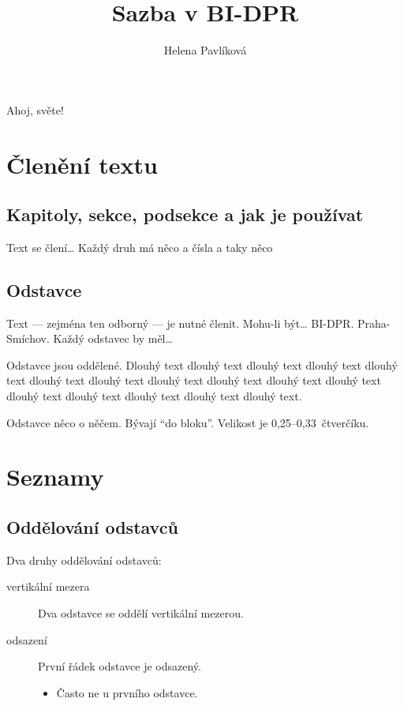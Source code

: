 \documentclass[a4paper]{article}
\title{Sazba v BI-DPR}
\author{Helena Pavlíková}
\begin{document}
    \maketitle
    
	Ahoj, světe!
	
	\tableofcontents
	
	\section{Členění textu}
	
	\subsection[Kapitoly]{Kapitoly, sekce, podsekce a jak je používat}
	
	Text se člení\dots{}
	Každý druh má něco a čísla a taky něco
	
	\subsection{Odstavce}\label{odstavce}
	
	Text --- zejména ten odborný --- je nutné členit. Mohu-li být\dots{} BI-DPR. 
	Praha-Smíchov.
	Každý odstavec by měl\dots{}
	
	Odstavce jsou oddělené.
	Dlouhý text dlouhý text dlouhý text dlouhý text dlouhý text dlouhý text dlouhý text dlouhý text dlouhý text dlouhý text dlouhý text dlouhý text dlouhý text dlouhý text dlouhý text dlouhý text.
	
	Odstavce něco o něčem. Bývají \enquote{do bloku}. Velikost je 0,25--0,33~čtverčíku.
	
	\section{Seznamy}
	
	\subsection{Oddělování odstavců}
	
	Dva druhy oddělování odstavců:
	
	\begin{description}
	    \item[vertikální mezera] Dva odstavce se oddělí vertikální mezerou.
	    \item[odsazení] První řádek odstavce je odsazený.
	    \begin{itemize}
	        \item Často ne u prvního odstavce.
	    \end{itemize}
	\end{description}
	
\end{document}
